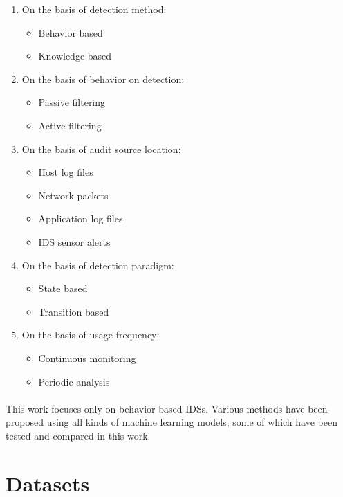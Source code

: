 \begin{enumerate}
    \item On the basis of detection method:
        \begin{itemize}
            \item Behavior based
            \item Knowledge based
        \end{itemize}
    \item On the basis of behavior on detection:
        \begin{itemize}
            \item Passive filtering
            \item Active filtering
        \end{itemize}
    \item On the basis of audit source location:
        \begin{itemize}
            \item Host log files
            \item Network packets
            \item Application log files
            \item IDS sensor alerts
        \end{itemize}
    \item On the basis of detection paradigm:
        \begin{itemize}
            \item State based
            \item Transition based
        \end{itemize}
    \item On the basis of usage frequency:
        \begin{itemize}
            \item Continuous monitoring
            \item Periodic analysis
        \end{itemize}
\end{enumerate}

\paragraph{}
This work focuses only on behavior based IDSs. Various methods have been proposed using all kinds of machine learning models, some of which have been tested and compared in this work.

\section{Datasets}

